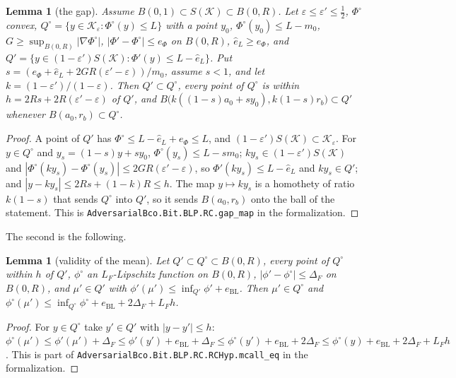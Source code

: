 \documentclass[11pt]{amsart}
\newtheorem{lemma}[theorem]{Lemma}
\theoremstyle{definition}
\numberwithin{equation}{section}
\newcommand{\cK}{\mathcal{K}}
\begin{document}
\begin{lemma}[the gap]\label{lem:gap}
Assume $B(0,1)\subset S(\cK)\subset B(0,R)$. Let $\varepsilon\le\varepsilon'\le\frac12$, $\Phi^\circ$ convex, $Q^\circ=\{y\in\cK_\varepsilon:\Phi^\circ(y)\le L\}$ with a point $y_0$, $\Phi^\circ(y_0)\le L-m_0$, $G\ge\sup_{B(0,R)}|\nabla\Phi^\circ|$, $|\Phi'-\Phi^\circ|\le e_\Phi$ on $B(0,R)$, $\hat e_L\ge e_\Phi$, and $Q'=\{y\in(1-\varepsilon')S(\cK):\Phi'(y)\le L-\hat e_L\}$. Put $s=(e_\Phi+\hat e_L+2GR(\varepsilon'-\varepsilon))/m_0$, assume $s<1$, and let $k=(1-\varepsilon')/(1-\varepsilon)$. Then $Q'\subset Q^\circ$, every point of $Q^\circ$ is within $h=2Rs+2R(\varepsilon'-\varepsilon)$ of $Q'$, and $B\bigl(k((1-s)a_0+sy_0),k(1-s)r_b\bigr)\subset Q'$ whenever $B(a_0,r_b)\subset Q^\circ$.
\end{lemma}

\begin{proof}
A point of $Q'$ has $\Phi^\circ\le L-\hat e_L+e_\Phi\le L$, and $(1-\varepsilon')S(\cK)\subset\cK_\varepsilon$. For $y\in Q^\circ$ and $y_s=(1-s)y+sy_0$, $\Phi^\circ(y_s)\le L-sm_0$; $ky_s\in(1-\varepsilon')S(\cK)$ and $|\Phi^\circ(ky_s)-\Phi^\circ(y_s)|\le2GR(\varepsilon'-\varepsilon)$, so $\Phi'(ky_s)\le L-\hat e_L$ and $ky_s\in Q'$; and $|y-ky_s|\le2Rs+(1-k)R\le h$. The map $y\mapsto ky_s$ is a homothety of ratio $k(1-s)$ that sends $Q^\circ$ into $Q'$, so it sends $B(a_0,r_b)$ onto the ball of the statement.
This is \texttt{AdversarialBco.Bit.BLP.RC.gap\_map} in the formalization.
\end{proof}

The second is the following.

\begin{lemma}[validity of the mean]\label{lem:val}
Let $Q'\subset Q^\circ\subset B(0,R)$, every point of $Q^\circ$ within $h$ of $Q'$, $\phi^\circ$ an $L_F$-Lipschitz function on $B(0,R)$, $|\phi'-\phi^\circ|\le\Delta_F$ on $B(0,R)$, and $\mu'\in Q'$ with $\phi'(\mu')\le\inf_{Q'}\phi'+e_{\mathrm{BL}}$. Then $\mu'\in Q^\circ$ and $\phi^\circ(\mu')\le\inf_{Q^\circ}\phi^\circ+e_{\mathrm{BL}}+2\Delta_F+L_Fh$.
\end{lemma}

\begin{proof}
For $y\in Q^\circ$ take $y'\in Q'$ with $|y-y'|\le h$: $\phi^\circ(\mu')\le\phi'(\mu')+\Delta_F\le\phi'(y')+e_{\mathrm{BL}}+\Delta_F\le\phi^\circ(y')+e_{\mathrm{BL}}+2\Delta_F\le\phi^\circ(y)+e_{\mathrm{BL}}+2\Delta_F+L_Fh$.
This is part of \texttt{AdversarialBco.Bit.BLP.RC.\allowbreak RCHyp.mcall\_eq} in the formalization.
\end{proof}
\end{document}
